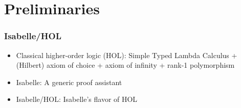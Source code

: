 \documentclass[aspectratio=169,10pt]{beamer}
\begin{document}
\section{Preliminaries}
\begin{frame}[fragile]
  \frametitle{Isabelle/HOL}
  \begin{itemize}
    \item Classical higher-order logic (HOL): Simple Typed Lambda Calculus + (Hilbert) axiom of choice + axiom of infinity + rank-1 polymorphism
          \pause
    \item Isabelle: A generic proof assistant
          \begin{overlayarea}{\textwidth}{.45\textheight}
            \centering
            \begin{figure}
              \centering
            \end{figure}
          \end{overlayarea}
    \item Isabelle/HOL: Isabelle's flavor of HOL
  \end{itemize}
\end{frame}
\end{document}
